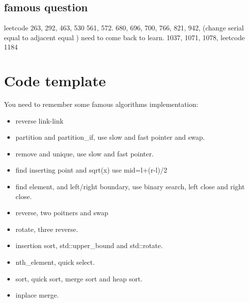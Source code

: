 \documentclass[a4paper,11pt,twoside]{book}
\begin{document}
\subsection{famous question}

	\par leetcode 263, 292, 463, 530 561, 572. 680, 696, 700, 766, 821, 942,  (change serial equal to adjacent equal ) need to come back to learn. 1037, 1071, 1078, leetcode 1184 


\section{Code template}

	\par You need to remember some famous algorithms implementation:
\begin{itemize}
	\item reverse link-link
	
	\item partition and partition\_if, use slow and fast pointer and swap.
	
	\item remove and unique, use slow and fast pointer.
	
	\item find inserting point and sqrt(x) use mid=l+(r-l)/2
	
	\item find element, and left/right boundary, use binary search, left close and right close.
	
	\item reverse, two poitners and swap
	
	\item rotate, three reverse. 
	
	\item insertion sort, std::upper\_bound and std::rotate.
	
	\item nth\_element, quick select.
	
	\item sort, quick sort, merge sort and heap sort.
	
	\item inplace merge.
\end{itemize}
	
\end{document}

